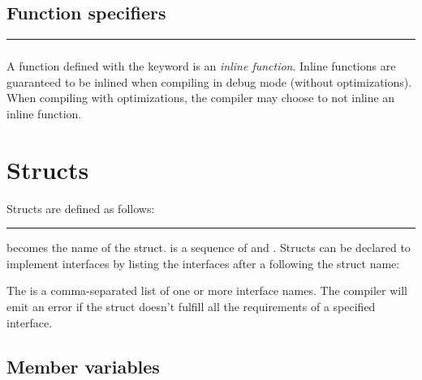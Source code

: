 \subsection{Function specifiers}
\label{sec:function-specifiers}

\begin{grammar}
\rule{function-specifier} 
\end{grammar}

\subsubsection{}

A function defined with the  keyword is an \textit{inline
function}. Inline functions are guaranteed to be inlined when compiling in debug
mode (without optimizations). When compiling with optimizations, the compiler
may choose to not inline an inline function.

\section{Structs}

Structs are defined as follows:

\begin{grammar}
\rule{struct-definition}   \code{\{}  \code{\}}
\end{grammar}

 becomes the name of the struct.
 is a sequence of
 and
. Structs can be declared to implement
interfaces by listing the interfaces after a \code{:} following the struct name:

\begin{grammar}
  \code{:}  \code{\{}  \code{\}}
\end{grammar}

The  is a comma-separated list of one or more
interface names. The compiler will emit an error if the struct doesn't fulfill
all the requirements of a specified interface.

\subsection{Member variables}

